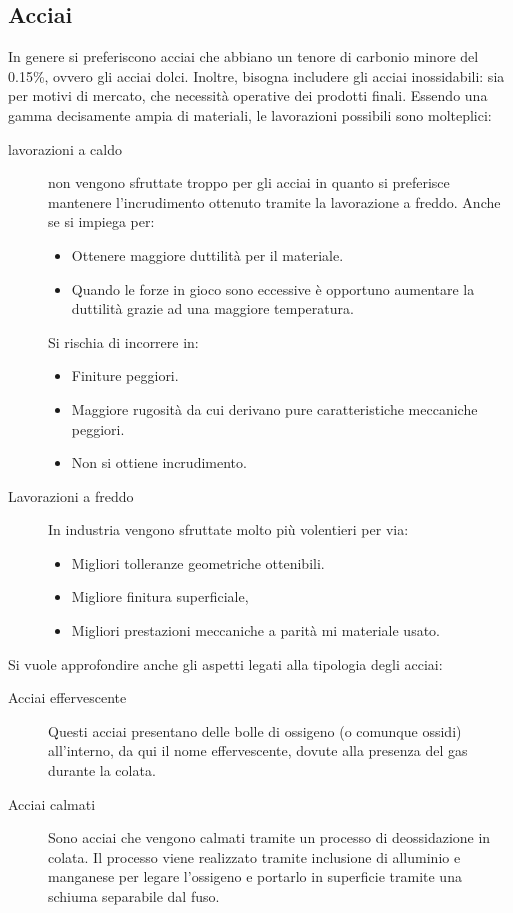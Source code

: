 \subsection{Acciai}
In genere si preferiscono acciai che abbiano un tenore di carbonio minore del 0.15\%, ovvero gli acciai dolci.
Inoltre, bisogna includere gli acciai inossidabili: sia per motivi di mercato, che necessità operative dei prodotti finali.
Essendo una gamma decisamente ampia di materiali, le lavorazioni possibili sono molteplici:
\begin{description}
\item[lavorazioni a caldo] non vengono sfruttate troppo per gli acciai in quanto si preferisce mantenere l'incrudimento ottenuto tramite la lavorazione a freddo. Anche se si impiega per:
	\begin{itemize}
	\item Ottenere maggiore duttilità per il materiale.
	\item Quando le forze in gioco sono eccessive è opportuno aumentare la duttilità grazie ad 
	una maggiore temperatura.
	\end{itemize}
	Si rischia di incorrere in:
	\begin{itemize}
	\item Finiture peggiori.
	\item Maggiore rugosità da cui derivano pure caratteristiche meccaniche peggiori.
	\item Non si ottiene incrudimento. 
	\end{itemize}
\item[Lavorazioni a freddo] In industria vengono sfruttate molto più volentieri per via:
	\begin{itemize}
	\item Migliori tolleranze geometriche ottenibili.
	\item Migliore finitura superficiale,
	\item Migliori prestazioni meccaniche a parità mi materiale usato.
	\end{itemize}
\end{description}

Si vuole approfondire anche gli aspetti legati alla tipologia degli acciai:
\begin{description}
\item[Acciai effervescente] Questi acciai presentano delle bolle di ossigeno (o comunque ossidi) all'interno, da qui il nome effervescente, dovute alla presenza del gas durante la colata.
\item[Acciai calmati] Sono acciai che vengono calmati tramite un processo di deossidazione in colata. Il processo viene realizzato tramite inclusione di alluminio e manganese per legare l'ossigeno e portarlo in superficie tramite una schiuma separabile dal fuso.
\end{description}

